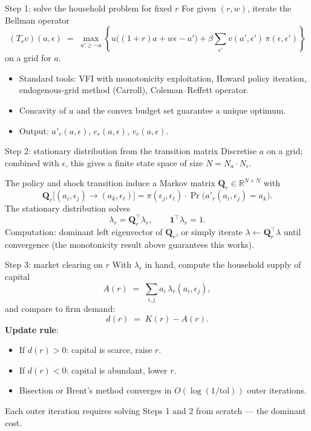 \documentclass[10pt,english,aspectratio=169]{beamer}
\begin{document}
\begin{frame}{Step 1: solve the household problem for fixed $r$}
For given $(r,w)$, iterate the Bellman operator
\[
(T_r v)(a,\epsilon) \;=\; \max_{a' \geq -\underline{a}}\!\left\{u\big((1+r)a + w\epsilon - a'\big) + \beta \sum_{\epsilon'} v(a',\epsilon')\,\pi(\epsilon,\epsilon')\right\}
\]
on a grid for $a$.
\medskip
\begin{itemize}
\item Standard tools: VFI with monotonicity exploitation, Howard policy iteration, endogenous-grid method (Carroll), Coleman--Reffett operator.
\medskip
\item Concavity of $u$ and the convex budget set guarantee a unique optimum.
\medskip
\item Output: $a'_r(a,\epsilon)$, $c_r(a,\epsilon)$, $v_r(a,\epsilon)$.
\end{itemize}
\end{frame}

\begin{frame}{Step 2: stationary distribution from the transition matrix}
Discretise $a$ on a grid; combined with $\epsilon$, this gives a finite state space of size $N = N_a \cdot N_\epsilon$.
\medskip

The policy and shock transition induce a Markov matrix $\mathbf{Q}_r \in \mathbb{R}^{N\times N}$ with
\[
\mathbf{Q}_r\big[(a_i,\epsilon_j) \to (a_k,\epsilon_\ell)\big]
= \pi(\epsilon_j,\epsilon_\ell)\cdot\Pr\!\big(a'_r(a_i,\epsilon_j) = a_k\big).
\]
\medskip
The stationary distribution solves
\[
\lambda_r = \mathbf{Q}_r^\top \lambda_r, \qquad \mathbf{1}^\top \lambda_r = 1.
\]
\medskip
Computation: dominant left eigenvector of $\mathbf{Q}_r$, or simply iterate $\lambda \leftarrow \mathbf{Q}_r^\top \lambda$ until convergence (the monotonicity result above guarantees this works).
\end{frame}

\begin{frame}{Step 3: market clearing on $r$}
With $\lambda_r$ in hand, compute the household supply of capital
\[
A(r) \;=\; \sum_{i,j} a_i \,\lambda_r(a_i,\epsilon_j),
\]
and compare to firm demand:
\[
d(r) \;=\; K(r) - A(r).
\]
\medskip
\textbf{Update rule}:
\begin{itemize}
\item If $d(r) > 0$: capital is scarce, raise $r$.
\item If $d(r) < 0$: capital is abundant, lower $r$.
\item Bisection or Brent's method converges in $O(\log(1/\text{tol}))$ outer iterations.
\end{itemize}
\medskip
Each outer iteration requires solving Steps 1 and 2 from scratch --- the dominant cost.
\end{frame}
\end{document}
